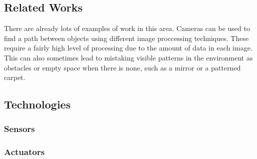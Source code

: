 \documentclass[11pt,fleqn,twoside]{article}
\begin{document}
\subsection{Related Works}
There are already lots of examples of work in this area.  Cameras can be used to find a path between objects using different image proccessing techniques.  These require a fairly high level of processing due to the amount of data in each image.  This can also sometimes lead to mistaking visible patterns in the environment as obstacles or empty space when there is none, such as a mirror or a patterned carpet. %
\subsection{Technologies}

\subsubsection{Sensors}

\subsubsection{Actuators}
\end{document}
